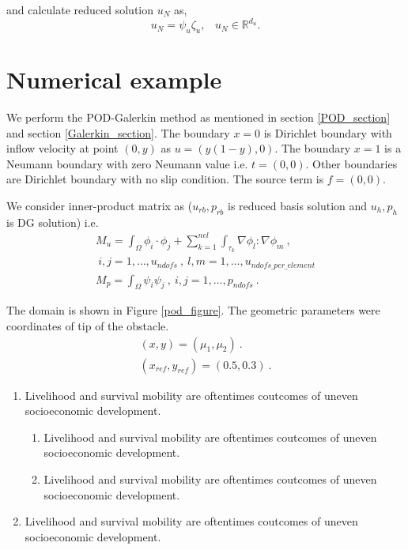\documentclass[graybox]{svmult}
\begin{document}
and calculate reduced solution $u_N$ as,
\begin{equation}
u_N = \psi_u \zeta_u \textrm{,} \quad u_N \in \mathbb{R}^{d_u} \textrm{.}
\end{equation}

\section{Numerical example}

We perform the POD-Galerkin method as mentioned in section \ref{POD_section} and section \ref{Galerkin_section}. The boundary ${x=0}$ is Dirichlet boundary with inflow velocity at point $(0,y)$ as $u = (y(1-y), 0)$. The boundary ${x = 1}$ is a Neumann boundary with zero Neumann value i.e. $t = (0, 0)$. Other boundaries are Dirichlet boundary with no slip condition. The source term is $f = (0,0)$.

We consider inner-product matrix as ($u_{rb},p_{rb}$ is reduced basis solution and $u_h,p_h$ is DG solution) i.e.
\begin{gather*}
M_u = \int_{\Omega} \phi_i \cdot \phi_j + \sum_{k=1}^{nel} \int_{\tau_k} \nabla \phi_l : \nabla \phi_m \ ,  \\ \ i,j = 1, \ldots, u_{ndofs} \ , \ l,m = 1,\ldots,u_{ndofs\_per\_element} \\
M_p = \int_{\Omega} \psi_i \psi_j \ , \ i,j = 1, \ldots, p_{ndofs} \ .
\end{gather*}

The domain is shown in Figure \ref{pod_figure}. The geometric parameters were coordinates of tip of the obstacle.
\begin{gather*}
(x,y) = (\mu_1,\mu_2) \ . \\
(x_{ref},y_{ref}) = (0.5,0.3) \ .
\end{gather*}

\begin{enumerate}
\item{Livelihood and survival mobility are oftentimes coutcomes of uneven socioeconomic development.}
\begin{enumerate}
\item{Livelihood and survival mobility are oftentimes coutcomes of uneven socioeconomic development.}
\item{Livelihood and survival mobility are oftentimes coutcomes of uneven socioeconomic development.}
\end{enumerate}
\item{Livelihood and survival mobility are oftentimes coutcomes of uneven socioeconomic development.}
\end{enumerate}
\end{document}
